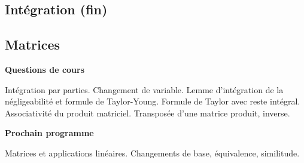 





\subsection{Intégration (fin)}

\subsection{Matrices}


\bigskip
\begin{center}
 \textbf{Questions de cours}
\end{center}
Intégration par parties.\newline
Changement de variable.
Lemme d'intégration de la négligeabilité et formule de Taylor-Young.\newline
Formule de Taylor avec reste intégral.\newline
Associativité du produit matriciel.\newline
Transposée d'une matrice produit, inverse.

\begin{center}
 \textbf{Prochain programme}
\end{center}
Matrices et applications linéaires. Changements de base, équivalence, similitude.

